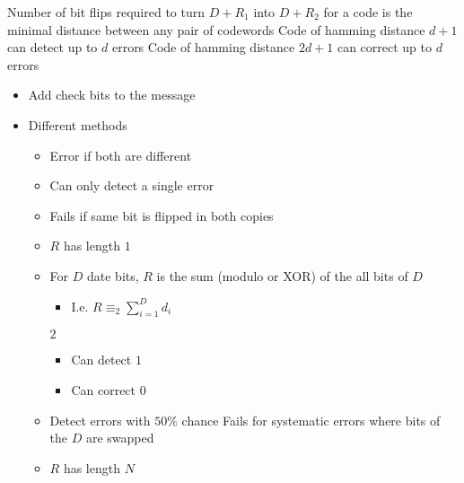 \begin{itemize}
\begin{itemize}
             Number of bit flips required to turn $D + R_1$ into $D + R_2$
             for a code is the minimal distance between any pair of codewords
             Code of hamming distance $d + 1$ can detect up to $d$ errors
             Code of hamming distance $2d + 1$ can correct up to $d$ errors
        \end{itemize}
        \begin{itemize}
            \item Add check bits to the message
            \item Different methods
                \begin{itemize}
                     Send each message twice
                    \item Error if both are different
                    \item Can only detect a single error
                    \item Fails if same bit is flipped in both copies
                \end{itemize}
                \begin{itemize}
                    \item $R$ has length $1$
                    \item For $D$ date bits, $R$ is the sum (modulo or XOR) of the all bits of $D$
                        \begin{itemize}
                            \item I.e. $R \equiv_2 \sum_{i=1}^{D} d_i$
                        \end{itemize}
                     $2$
                        \begin{itemize}
                            \item Can detect $1$
                            \item Can correct $0$
                        \end{itemize}
                    \item Detect errors with $50\%$ chance
                    \icon Fails for systematic errors where bits of the $D$ are swapped
                \end{itemize}
                \begin{itemize}
                    \item $R$ has length $N$

\end{itemize}
\end{itemize}
\end{itemize}
